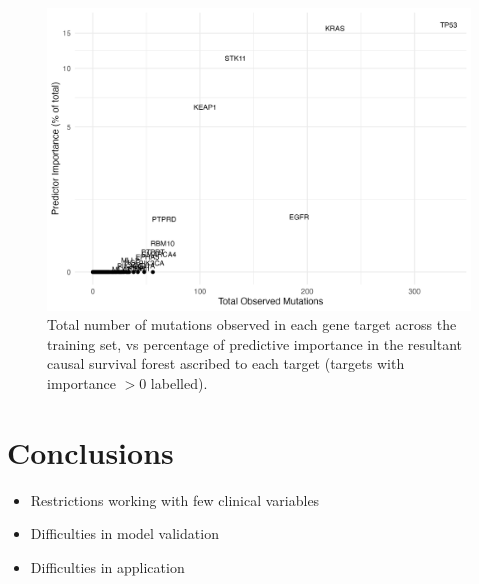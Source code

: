 \documentclass[../thesis.tex]{subfiles}
\begin{document}
\begin{figure}[!tpb] 
\centering
\includegraphics[width=\textwidth]{figures/chapter4/immuno_importance_vs_rate_panel.png}
\caption{Total number of mutations observed in each gene target across the training set, vs  percentage of predictive importance in the resultant causal survival forest ascribed to each target (targets with importance $>0$ labelled).  \label{fig:immuno_importance_vs_rate_panel}}
\end{figure}

\section{Conclusions}
{\color{red} \begin{itemize}
    \item Restrictions working with few clinical variables
    \item Difficulties in model validation
    \item Difficulties in application
\end{itemize}}

\dobib %
\end{document}
